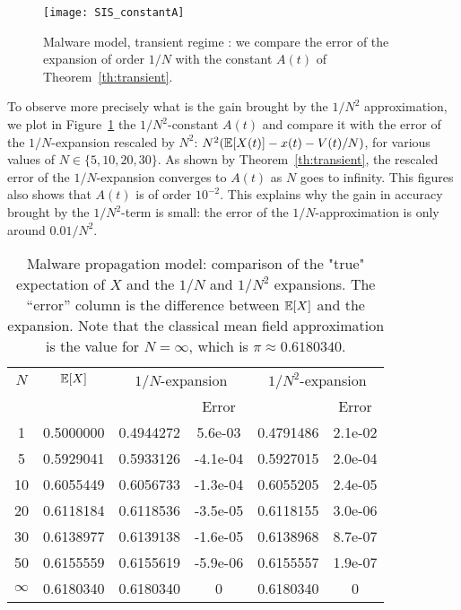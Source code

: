 \documentclass[sigconf]{acmart}
\newcommand\esp[1]{{\mathchoice{\besp{#1}}{\sesp{#1}}{\sesp{#1}}{\sesp{#1}}}}
\newcommand\besp[1]{\mathbb{E}\left[#1\right]}
\newcommand\sesp[1]{\mathbb{E}[#1]}
\begin{document}
\begin{figure}[t]
  \centering
  \texttt{[image: SIS\_constantA]}
  \caption{Malware model, transient regime : we compare the error of
    the expansion of order $1/N$ with the constant $A(t)$ of
    Theorem~\ref{th:transient}. }
  \label{fig:SIS-transient2}
\end{figure}
To observe more precisely what is the gain brought by the $1/N^2$
approximation, we plot in Figure~\ref{fig:SIS-transient2} the
$1/N^2$-constant $A(t)$ and compare it with the error of the
$1/N$-expansion rescaled by $N^2$: $N^2(\esp{X(t)}-x(t)-V(t)/N)$, for
various values of $N\in\{5,10,20,30\}$. As shown by
Theorem~\ref{th:transient}, the rescaled error of the $1/N$-expansion
converges to $A(t)$ as $N$ goes to infinity. This figures also shows
that $A(t)$ is of order $10^{-2}$. This explains why the gain in
accuracy brought by the $1/N^2$-term is small: the error of the
$1/N$-approximation is only around $0.01/N^2$.




\begin{table}[t]
  \centering
  \begin{tabular}{|c|c|c|c|c|c|}
    \hline
    $N$ & $\esp{X}$ &\multicolumn{2}{c|}{$1/N$-expansion}
    &\multicolumn{2}{c|}{$1/N^2$-expansion}\\
        & & &Error & &Error\\\hline
    1 & 0.5000000 & 0.4944272 & 5.6e-03 & 0.4791486 & 2.1e-02\\
    5 & 0.5929041 & 0.5933126 & -4.1e-04 & 0.5927015 & 2.0e-04\\
    10 & 0.6055449 & 0.6056733 & -1.3e-04 & 0.6055205 & 2.4e-05\\
    20 & 0.6118184 & 0.6118536 & -3.5e-05 & 0.6118155 & 3.0e-06\\
    30 & 0.6138977 & 0.6139138 & -1.6e-05 & 0.6138968 & 8.7e-07\\
    50 & 0.6155559 & 0.6155619 & -5.9e-06 & 0.6155557 & 1.9e-07\\
    $\infty$&0.6180340&0.6180340&0&0.6180340 & 0\\
    \hline
  \end{tabular}
  \caption{Malware propagation model: comparison of the "true"
    expectation of $X$ and the $1/N$ and $1/N^2$ expansions. The
    ``error'' column is the difference between $\esp{X}$ and the
    expansion.  
      Note that the classical mean field approximation is
    the value for $N=\infty$, which is $\pi\approx0.6180340$. 
  }
  \label{tab:SIS}
\end{table}
\end{document}
